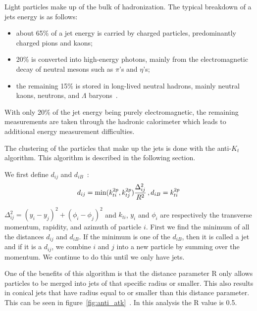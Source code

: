 Light particles make up of the bulk of hadronization.  The typical breakdown of a jets energy is as follows:
\begin{itemize}
 \item
about 65\% of a jet energy is carried by charged particles, predominantly
charged pions and kaons;
\item
 20\% is converted into high-energy photons, mainly from the electromagnetic
decay of neutral mesons such as $\pi$'s and $\eta$'s;
\item
 the remaining 15\% is stored in long-lived neutral hadrons, mainly neutral
kaons, neutrons, and $\Lambda$ baryons~\cite{Pandolfi_thesis}.
\end{itemize}

With only 20\% of the jet energy being purely electromagnetic, the remaining measurements are taken through the hadronic calorimeter which leads to additional energy measurement difficulties.

The clustering of the particles that make up the jets is done with the anti-$K_t$ algorithm.  This algorithm is described in the following section. 

We first define $d_{ij}$ and $d_{iB}$~\cite{1126-6708-2008-04-063}:
\begin{equation}
d_{ij} = \min(k_{ti}^{2p}, k_{tj}^{2p}) \frac{\Delta_{ij}^2}{R^2}\,,\\
d_{iB} = k_{ti}^{2p}\,
\end{equation}

$\Delta_{ij}^2 = (y_i-y_j)^2 + (\phi_i - \phi_j)^2$ and $k_{ti}$, $y_i$ and $\phi_i$ are respectively the transverse momentum, rapidity, and azimuth of particle $i$. First we find the minimum of all the distances $d_{ij}$ and $d_{iB}$. If the minimum is one of the $d_{iB}$, then it is called a jet and if it is a $d_{ij}$, we combine $i$ and $j$ into a new particle by summing over the momentum.  We continue to do this until we only have jets.

One of the benefits of this algorithm is that the distance parameter R only allows particles to be merged into jets of that specific radius or smaller.  This also results in conical jets that have radius equal to or smaller than this distance parameter. This can be seen in figure~\ref{fig:anti_atk}~\cite{1126-6708-2008-04-063}. In this analysis the R value is 0.5.

